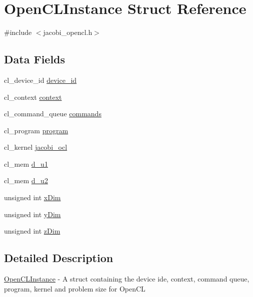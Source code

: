 \hypertarget{struct_open_c_l_instance}{\section{Open\-C\-L\-Instance Struct Reference}
\label{struct_open_c_l_instance}
}


{\ttfamily \#include $<$jacobi\-\_\-opencl.\-h$>$}

\subsection*{Data Fields}
\begin{DoxyCompactItemize}
\item 
cl\-\_\-device\-\_\-id \hyperlink{struct_open_c_l_instance_a22e36a6758529a5000288a7dfb5fd231}{device\-\_\-id}
\item 
cl\-\_\-context \hyperlink{struct_open_c_l_instance_a44eab7fed94fa64d0a67fa3f992ce502}{context}
\item 
cl\-\_\-command\-\_\-queue \hyperlink{struct_open_c_l_instance_a0af493bf8b0fa33e91dd7e7675b4a2d8}{commands}
\item 
cl\-\_\-program \hyperlink{struct_open_c_l_instance_a883163fd9246e6704b1334e69548158c}{program}
\item 
cl\-\_\-kernel \hyperlink{struct_open_c_l_instance_ac97210abd5948c1c67da9a0f7fa6f646}{jacobi\-\_\-ocl}
\item 
cl\-\_\-mem \hyperlink{struct_open_c_l_instance_ae2de6de8249187081eab1b552ba1c1a0}{d\-\_\-u1}
\item 
cl\-\_\-mem \hyperlink{struct_open_c_l_instance_a1625f6746ccb378443e0195e74c99f9a}{d\-\_\-u2}
\item 
unsigned int \hyperlink{struct_open_c_l_instance_a19687918b1afb192ab716e277960738f}{x\-Dim}
\item 
unsigned int \hyperlink{struct_open_c_l_instance_a05ee9f97ea7397d010948c5f13e85529}{y\-Dim}
\item 
unsigned int \hyperlink{struct_open_c_l_instance_a20e097a486b0f9b58dbd53b97f09e26c}{z\-Dim}
\end{DoxyCompactItemize}


\subsection{Detailed Description}
\hyperlink{struct_open_c_l_instance}{Open\-C\-L\-Instance} -\/ A struct containing the device ide, context, command queue, program, kernel and problem size for Open\-C\-L 

